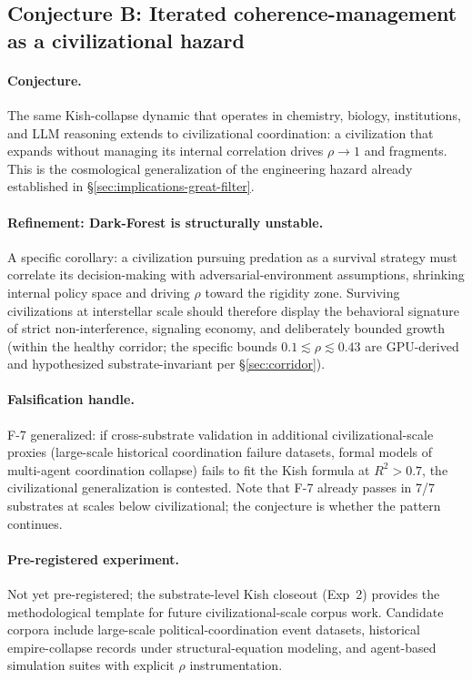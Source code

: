\documentclass[11pt,a4paper]{article}
\begin{document}
\subsection{Conjecture B: Iterated coherence-management as a civilizational hazard}
\label{sec:conjecture-civilizational-conjecture}

\paragraph{Conjecture.} The same Kish-collapse dynamic that operates in chemistry, biology, institutions, and LLM reasoning extends to civilizational coordination: a civilization that expands without managing its internal correlation drives $\rho \to 1$ and fragments. This is the cosmological generalization of the engineering hazard already established in \S\ref{sec:implications-great-filter}.

\paragraph{Refinement: Dark-Forest is structurally unstable.} A specific corollary: a civilization pursuing predation as a survival strategy must correlate its decision-making with adversarial-environment assumptions, shrinking internal policy space and driving $\rho$ toward the rigidity zone. Surviving civilizations at interstellar scale should therefore display the behavioral signature of strict non-interference, signaling economy, and deliberately bounded growth (within the healthy corridor; the specific bounds $0.1 \lesssim \rho \lesssim 0.43$ are GPU-derived and hypothesized substrate-invariant per \S\ref{sec:corridor}).

\paragraph{Falsification handle.} F-7 generalized: if cross-substrate validation in additional civilizational-scale proxies (large-scale historical coordination failure datasets, formal models of multi-agent coordination collapse) fails to fit the Kish formula at $R^2 > 0.7$, the civilizational generalization is contested. Note that F-7 already passes in 7/7 substrates at scales below civilizational; the conjecture is whether the pattern continues.

\paragraph{Pre-registered experiment.} Not yet pre-registered; the substrate-level Kish closeout (Exp~2) provides the methodological template for future civilizational-scale corpus work. Candidate corpora include large-scale political-coordination event datasets, historical empire-collapse records under structural-equation modeling, and agent-based simulation suites with explicit $\rho$ instrumentation.
\end{document}
